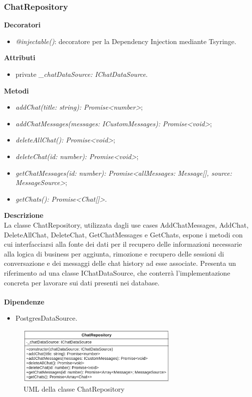 \newpage

\subsubsection{ChatRepository}
\textbf{Decoratori}
\begin{itemize}
    \item \textit{@injectable()}: decoratore per la Dependency Injection mediante Tsyringe.
\end{itemize}
\textbf{Attributi}
\begin{itemize}
    \item private \textit{\_chatDataSource: IChatDataSource}.
\end{itemize}
\textbf{Metodi}
\begin{itemize}[itemsep=-4pt]
    \item \textit{addChat(title: string): Promise<number>};
    \item \textit{addChatMessages(messages: ICustomMessages): Promise<void>};
    \item \textit{deleteAllChat(): Promise<void>};
    \item \textit{deleteChat(id: number): Promise<void>};
    \item \textit{getChatMessages(id: number): Promise<allMessages: Message[], source: MessageSource>};
    \item \textit{getChats(): Promise<Chat[]>}.
\end{itemize}
\textbf{Descrizione}\\
La classe ChatRepository, utilizzata dagli use cases AddChatMessages, AddChat, DeleteAllChat, DeleteChat, GetChatMessages e GetChats, espone i metodi con cui interfacciarsi alla fonte dei dati per il recupero delle informazioni necessarie alla logica di business per aggiunta, rimozione e recupero delle sessioni di conversazione e dei messaggi delle chat history ad esse associate. Presenta un riferimento ad una classe IChatDataSource, che conterrà l'implementazione concreta per lavorare sui dati presenti nei database.\\ \\
\textbf{Dipendenze}
\begin{itemize}
    \item PostgresDataSource.
\end{itemize}

\begin{figure}[h!]
    \centering  
    \includegraphics[width=0.7\textwidth]{ChatRepository.png}
    \caption{UML della classe ChatRepository}
\end{figure}